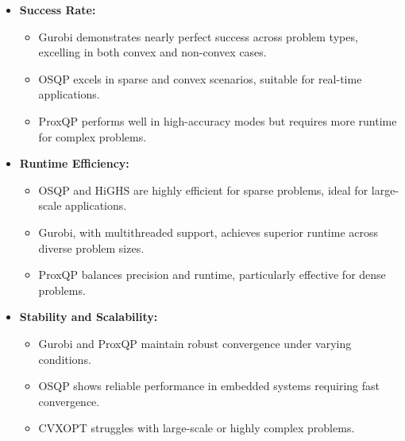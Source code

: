 \documentclass{article}
\begin{document}
\begin{itemize}
    \item \textbf{Success Rate:} 
    \begin{itemize}
        \item Gurobi demonstrates nearly perfect success across problem types, excelling in both convex and non-convex cases.
        \item OSQP excels in sparse and convex scenarios, suitable for real-time applications.
        \item ProxQP performs well in high-accuracy modes but requires more runtime for complex problems.
    \end{itemize}
    \item \textbf{Runtime Efficiency:}
    \begin{itemize}
        \item OSQP and HiGHS are highly efficient for sparse problems, ideal for large-scale applications.
        \item Gurobi, with multithreaded support, achieves superior runtime across diverse problem sizes.
        \item ProxQP balances precision and runtime, particularly effective for dense problems.
    \end{itemize}
    \item \textbf{Stability and Scalability:}
    \begin{itemize}
        \item Gurobi and ProxQP maintain robust convergence under varying conditions.
        \item OSQP shows reliable performance in embedded systems requiring fast convergence.
        \item CVXOPT struggles with large-scale or highly complex problems.
    \end{itemize}
\end{itemize}




\end{document}
